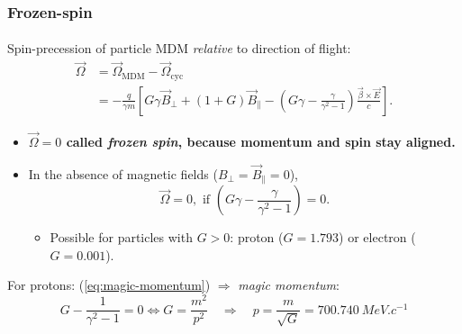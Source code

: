 \begin{frame}
\frametitle{Frozen-spin}
\framesubtitle{}

\vspace{-0.3cm}
\begin{block}{Spin-precession of particle MDM   \textit{relative} to direction of flight:}
	\begin{equation}
	\begin{split}
	\vec \Omega & = \vec \Omega_\text{MDM} - \vec \Omega_\text{cyc} \\
	& = - \frac{q}{\gamma m} \left[G \gamma \vec B_\perp + (1 + G) \vec B_\parallel - \left(G\gamma - \frac{\gamma}{\gamma^2 -1} \right) \frac{\vec \beta \times \vec E}{c}\right].  
	\end{split}
	\end{equation}
	\vspace{-0.3cm}
	\begin{itemize}
		\item[$\Rightarrow$] \textbf{$\vec \Omega = 0$ called \textit{frozen spin}, because  momentum and spin stay aligned.}
	\end{itemize}
	\begin{itemize}
		\item In the absence of magnetic fields ($B_\perp = \vec B_\parallel = 0$), 
		\begin{equation}
		\vec \Omega=0, \text{ if } \left(G\gamma - \frac{\gamma}{\gamma^2 -1} \right) = 0.
		\label{eq:magic-momentum}
		\end{equation}
		\vspace{-0.3cm}
		\begin{itemize}
			\item[-] Possible for particles with $G>0$:   proton ($G=1.793$) or electron ($G=0.001$).
		\end{itemize}
	\end{itemize}
\end{block}


\begin{exampleblock}{For protons:  (\ref{eq:magic-momentum}) $\Rightarrow$ \textit{magic momentum}:}
	\begin{equation}
	G- \frac{1}{\gamma^2-1} = 0 \Leftrightarrow G = \frac{m^2}{p^2} 
	\quad \Rightarrow \quad \boxed{p = \frac{m}{\sqrt{G}} = \SI{700.740}{MeV.c^{-1}}}
	\end{equation}
\end{exampleblock}

\end{frame}